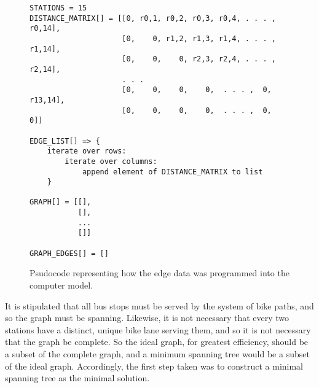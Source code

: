 \documentclass{article}
\begin{document}
\begin{figure}[!hbp]
    \begin{Verbatim}[frame=single] 
STATIONS = 15 
DISTANCE_MATRIX[] = [[0, r0,1, r0,2, r0,3, r0,4, . . . , r0,14], 
                     [0,    0, r1,2, r1,3, r1,4, . . . , r1,14], 
                     [0,    0,    0, r2,3, r2,4, . . . , r2,14], 
                     . . . 
                     [0,    0,    0,    0,  . . . ,  0, r13,14], 
                     [0,    0,    0,    0,  . . . ,  0,      0]]
       
EDGE_LIST[] => {
    iterate over rows: 
        iterate over columns: 
            append element of DISTANCE_MATRIX to list
    }
    
GRAPH[] = [[], 
           [], 
           ...
           []]

GRAPH_EDGES[] = []
    \end{Verbatim} 
    \caption[Programming edge data]{Psudocode representing how the edge data was programmed into the computer model.}
    \label{code1} 
    \end{figure}    

It is stipulated that all bus stops must be served by the system of bike paths, and so the graph must be spanning.  Likewise, it is not necessary that every two stations have a distinct, unique bike lane serving them, and so it is not necessary that the graph be complete.  So the ideal graph, for greatest efficiency, should be a subset of the complete graph, and a minimum spanning tree would be a subset of the ideal graph.  Accordingly, the first step taken was to construct a minimal spanning tree as the minimal solution.
\end{document}
